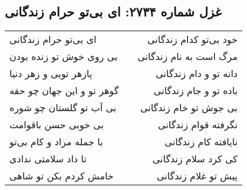 \begin{center}
\section*{غزل شماره ۲۷۳۴: ای بی‌تو حرام زندگانی}
\label{sec:2734}
\begin{longtable}{l p{0.5cm} r}
ای بی‌تو حرام زندگانی
&&
خود بی‌تو کدام زندگانی
\\
بی روی خوش تو زنده بودن
&&
مرگ است به نام زندگانی
\\
پازهر تویی و زهر دنیا
&&
دانه تو و دام زندگانی
\\
گوهر تو و این جهان چو حقه
&&
باده تو و جام زندگانی
\\
بی آب تو گلستان چو شوره
&&
بی جوش تو خام زندگانی
\\
بی خوبی حسن باقوامت
&&
نگرفته قوام زندگانی
\\
با جمله مراد و کام بی‌تو
&&
نایافته کام زندگانی
\\
تا داد سلامتی ندادی
&&
کی کرد سلام زندگانی
\\
خامش کردم بکن تو شاهی
&&
پیش تو غلام زندگانی
\\
\end{longtable}
\end{center}
